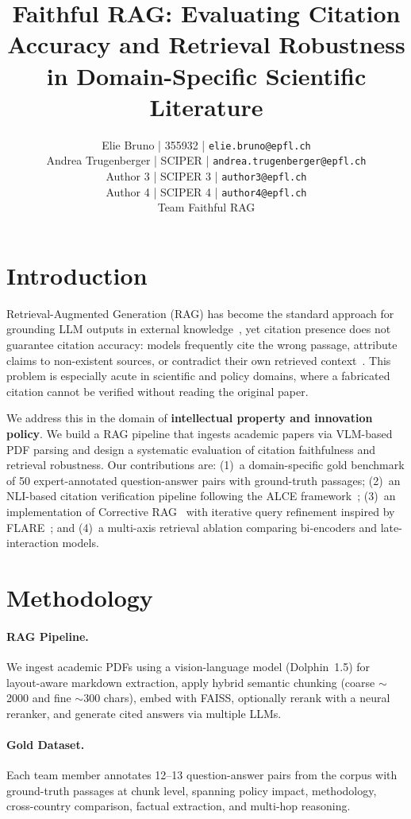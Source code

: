 \documentclass[11pt]{article}
\title{Faithful RAG: Evaluating Citation Accuracy and Retrieval Robustness in Domain-Specific Scientific Literature}
\author{\normalfont
Elie Bruno | 355932 | \texttt{elie.bruno@epfl.ch} \\
Andrea Trugenberger | SCIPER | \texttt{andrea.trugenberger@epfl.ch} \\
Author 3 | SCIPER 3 | \texttt{author3@epfl.ch} \\
Author 4 | SCIPER 4 | \texttt{author4@epfl.ch} \\
Team Faithful RAG
}
\begin{document}
\maketitle

\section{Introduction}

Retrieval-Augmented Generation (RAG) has become the standard approach for grounding LLM outputs in external knowledge~\cite{retrievalaugmentedgeneration}, yet citation presence does not guarantee citation accuracy: models frequently cite the wrong passage, attribute claims to non-existent sources, or contradict their own retrieved context~\cite{min-etal-2023-factscore}. This problem is especially acute in scientific and policy domains, where a fabricated citation cannot be verified without reading the original paper.

We address this in the domain of \textbf{intellectual property and innovation policy}. We build a RAG pipeline that ingests academic papers via VLM-based PDF parsing and design a systematic evaluation of citation faithfulness and retrieval robustness. Our contributions are: (1)~a domain-specific gold benchmark of 50 expert-annotated question-answer pairs with ground-truth passages; (2)~an NLI-based citation verification pipeline following the ALCE framework~\cite{gao2023enabling}; (3)~an implementation of Corrective RAG~\cite{yan2024corrective} with iterative query refinement inspired by FLARE~\cite{jiang2023active}; and (4)~a multi-axis retrieval ablation comparing bi-encoders and late-interaction models.

\section{Methodology}

\paragraph{RAG Pipeline.} We ingest academic PDFs using a vision-language model (Dolphin~1.5) for layout-aware markdown extraction, apply hybrid semantic chunking (coarse ${\sim}$2000 and fine ${\sim}$300 chars), embed with FAISS, optionally rerank with a neural reranker, and generate cited answers via multiple LLMs.

\paragraph{Gold Dataset.} Each team member annotates 12--13 question-answer pairs from the corpus with ground-truth passages at chunk level, spanning policy impact, methodology, cross-country comparison, factual extraction, and multi-hop reasoning.
\end{document}
